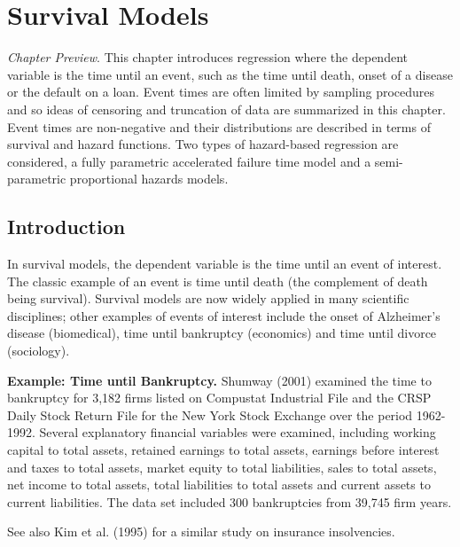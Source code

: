 \setcounter{chapter}{13}
\chapter{Survival Models}

{\small \textit{Chapter Preview}. This chapter introduces regression
where the dependent variable is the time until an event, such as the
time until death, onset of a disease or the default on a loan. Event
times are often limited by sampling procedures and so ideas of
censoring and truncation of data are summarized in this chapter.
Event times are non-negative and their distributions are described
in terms of survival and hazard functions. Two types of hazard-based
regression are considered, a fully parametric accelerated failure
time model and a semi-parametric proportional hazards models.}

\section{Introduction}

In survival models, the dependent variable is the time until an
event of interest. The classic example of an event is time until
death (the complement of death being survival). Survival models are
now widely applied in many scientific disciplines; other examples of
events of interest include the onset of Alzheimer's disease
(biomedical), time until bankruptcy (economics) and time until
divorce (sociology).

\linejed{}

\textbf{Example: Time until Bankruptcy.} Shumway (2001) examined the time to bankruptcy for 3,182
firms listed on Compustat Industrial File and the CRSP Daily Stock
Return File for the New York Stock Exchange over the period
1962-1992. Several explanatory financial variables were examined,
including working capital to total assets, retained earnings to
total assets, earnings before interest and taxes to total assets,
market equity to total liabilities, sales to total assets, net
income to total assets, total liabilities to total assets and
current assets to current liabilities. The data set included 300
bankruptcies from 39,745 firm years.

See also Kim et al. (1995) for a similar study on insurance
insolvencies.

\linejed{}

